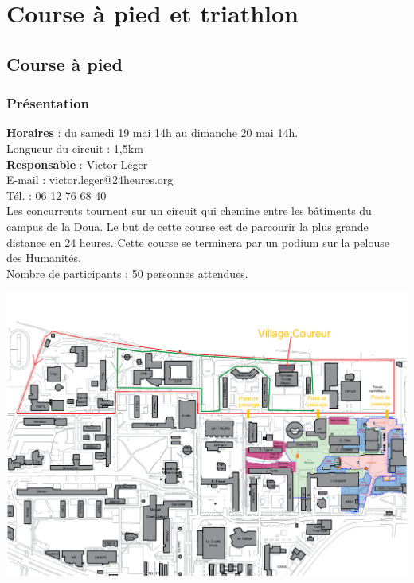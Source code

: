 \documentclass[hidelinks, paper=a4, fontsize=13pt]{report}
\begin{document}
\section{Course à pied et triathlon}
\subsection{Course à pied}

\subsubsection{Présentation}
\textbf{Horaires} : du samedi 19 mai 14h au dimanche 20 mai 14h.\\

Longueur du circuit : 1,5km\\

\textbf{Responsable} :  Victor Léger\\
	E-mail : victor.leger@24heures.org\\
	Tél. : 06 12 76 68 40\\

Les concurrents tournent sur un circuit qui chemine entre les bâtiments du campus de la Doua. Le but de cette course est de parcourir la plus grande distance en 24 heures. Cette course se terminera par un podium sur la pelouse des Humanités. \\

Nombre de participants : 50 personnes attendues.\\


\begin{center}
\includegraphics[width=.8\textwidth,keepaspectratio]{Exports/Plan_24h_44eme-Parcours_courses}
\end{center}
\end{document}
